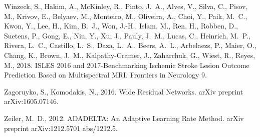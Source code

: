 \documentclass[letterpaper,final,authoryear,3p,times,twocolumn]{elsarticle}
\begin{document}
\begin{thebibliography}{36}
Winzeck, S., Hakim, A., McKinley, R., Pinto, J.~A., Alves, V., Silva, C.,
  Pisov, M., Krivov, E., Belyaev, M., Monteiro, M., Oliveira, A., Choi, Y.,
  Paik, M.~C., Kwon, Y., Lee, H., Kim, B.~J., Won, J.-H., Islam, M., Ren, H.,
  Robben, D., Suetens, P., Gong, E., Niu, Y., Xu, J., Pauly, J.~M., Lucas, C.,
  Heinrich, M.~P., Rivera, L.~C., Castillo, L.~S., Daza, L.~A., Beers, A.~L.,
  Arbelaezs, P., Maier, O., Chang, K., Brown, J.~M., Kalpathy-Cramer, J.,
  Zaharchuk, G., Wiest, R., Reyes, M., 2018. {ISLES 2016 and 2017-Benchmarking
  Ischemic Stroke Lesion Outcome Prediction Based on Multispectral MRI}.
  Frontiers in Neurology 9.

Zagoruyko, S., Komodakis, N., 2016. {Wide Residual Networks}. arXiv preprint
  arXiv:1605.07146.

Zeiler, M.~D., 2012. {ADADELTA: An Adaptive Learning Rate Method}. arXiv
  preprint arXiv:1212.5701 abs/1212.5.

\end{thebibliography}

\end{document}
